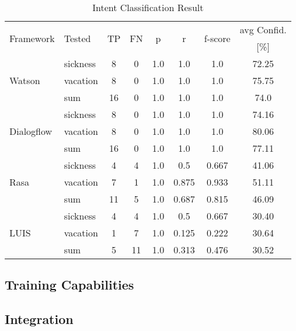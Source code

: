 \begin{table}[h]
    \centering
    \begin{tabular}{ l | l | c | c | c | c | c | c  }
        \multirow{2}{*}{Framework} & \multirow{2}{*}{Tested} & \multirow{2}{*}{TP} & \multirow{2}{*}{FN} & \multirow{2}{*}{p} & \multirow{2}{*}{r} & \multirow{2}{*}{f-score} & avg Confid. \\ 
                 &&          &            &   & & & [\%]     \\ \hline \hline
        \multirow{3}{*}{Watson} 
        & sickness & 8 & 0& 1.0& 1.0& 1.0&72.25 \\
        & vacation & 8 & 0& 1.0& 1.0& 1.0&75.75 \\
        & sum      &16 & 0& 1.0& 1.0& 1.0&74.0  \\ \hline
        
        \multirow{3}{*}{Dialogflow} 
        & sickness & 8& 0& 1.0& 1.0& 1.0&74.16\\
        & vacation & 8& 0& 1.0& 1.0& 1.0&80.06\\
        & sum      &16& 0& 1.0& 1.0& 1.0&77.11\\ \hline

        \multirow{3}{*}{Rasa} 
        & sickness & 4& 4& 1.0& 0.5  & 0.667& 41.06\\
        & vacation & 7& 1& 1.0& 0.875& 0.933& 51.11\\
        & sum      &11& 5& 1.0& 0.687& 0.815& 46.09\\ \hline

        \multirow{3}{*}{LUIS} 
        & sickness & 4& 4& 1.0& 0.5  & 0.667& 30.40\\
        & vacation & 1& 7& 1.0& 0.125& 0.222& 30.64\\
        & sum      & 5&11& 1.0& 0.313& 0.476& 30.52\\ \hline
    \end{tabular}
    \caption{Intent Classification Result} \label{tab:intent_classification_result}
\end{table} \noindent


\subsection*{Training Capabilities}
\subsection*{Integration}
